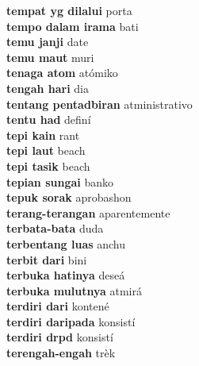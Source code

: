 \textbf{ tempat yg dilalui  } porta \\
\textbf{ tempo dalam irama  } bati \\
\textbf{ temu janji  } date \\
\textbf{ temu maut  } muri \\
\textbf{ tenaga atom  } atómiko \\
\textbf{ tengah hari  } dia \\
\textbf{ tentang pentadbiran  } atministrativo \\
\textbf{ tentu had  } definí \\
\textbf{ tepi kain  } rant \\
\textbf{ tepi laut  } beach \\
\textbf{ tepi tasik  } beach \\
\textbf{ tepian sungai  } banko \\
\textbf{ tepuk sorak  } aprobashon \\
\textbf{ terang-terangan  } aparentemente \\
\textbf{ terbata-bata  } duda \\
\textbf{ terbentang luas  } anchu \\
\textbf{ terbit dari  } bini \\
\textbf{ terbuka hatinya  } deseá \\
\textbf{ terbuka mulutnya  } atmirá \\
\textbf{ terdiri dari  } kontené \\
\textbf{ terdiri daripada  } konsistí \\
\textbf{ terdiri drpd  } konsistí \\
\textbf{ terengah-engah  } trèk \\
